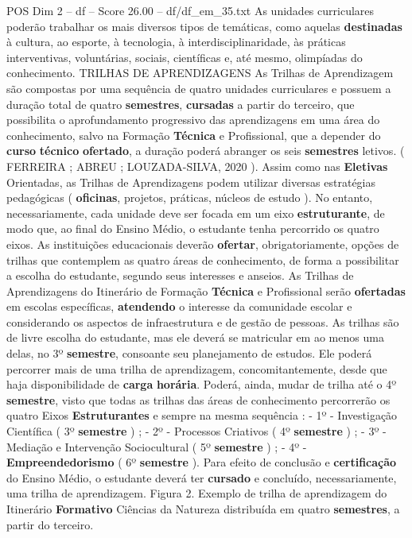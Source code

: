 \begin{textsample}{POS Dim 2 – df – Score 26.00 – df/df\_em\_35.txt}
As unidades curriculares poderão trabalhar os mais diversos tipos de temáticas, como aquelas \textbf{destinadas} à cultura, ao esporte, à tecnologia, à interdisciplinaridade, às práticas interventivas, voluntárias, sociais, científicas e, até mesmo, olimpíadas do conhecimento.
TRILHAS DE APRENDIZAGENS As Trilhas de Aprendizagem são compostas por uma sequência de quatro unidades curriculares e possuem a duração total de quatro \textbf{semestres}, \textbf{cursadas} a partir do terceiro, que possibilita o aprofundamento progressivo das aprendizagens em uma área do conhecimento, salvo na Formação \textbf{Técnica} e Profissional, que a depender do \textbf{curso} \textbf{técnico} \textbf{ofertado}, a duração poderá abranger os seis \textbf{semestres} letivos. ( FERREIRA ; ABREU ; LOUZADA-SILVA, 2020 ).
Assim como nas \textbf{Eletivas} Orientadas, as Trilhas de Aprendizagens podem utilizar diversas estratégias pedagógicas ( \textbf{oficinas}, projetos, práticas, núcleos de estudo ).
No entanto, necessariamente, cada unidade deve ser focada em um eixo \textbf{estruturante}, de modo que, ao final do Ensino Médio, o estudante tenha percorrido os quatro eixos.
As instituições educacionais deverão \textbf{ofertar}, obrigatoriamente, opções de trilhas que contemplem as quatro áreas de conhecimento, de forma a possibilitar a escolha do estudante, segundo seus interesses e anseios.
As Trilhas de Aprendizagens do Itinerário de Formação \textbf{Técnica} e Profissional serão \textbf{ofertadas} em escolas específicas, \textbf{atendendo} o interesse da comunidade escolar e considerando os aspectos de infraestrutura e de gestão de pessoas.
As trilhas são de livre escolha do estudante, mas ele deverá se matricular em ao menos uma delas, no 3º \textbf{semestre}, consoante seu planejamento de estudos.
Ele poderá percorrer mais de uma trilha de aprendizagem, concomitantemente, desde que haja disponibilidade de \textbf{carga} \textbf{horária}.
Poderá, ainda, mudar de trilha até o 4º \textbf{semestre}, visto que todas as trilhas das áreas de conhecimento percorrerão os quatro Eixos \textbf{Estruturantes} e sempre na mesma sequência : - 1º - Investigação Científica ( 3º \textbf{semestre} ) ; - 2º - Processos Criativos ( 4º \textbf{semestre} ) ; - 3º - Mediação e Intervenção Sociocultural ( 5º \textbf{semestre} ) ; - 4º - \textbf{Empreendedorismo} ( 6º \textbf{semestre} ).
Para efeito de conclusão e \textbf{certificação} do Ensino Médio, o estudante deverá ter \textbf{cursado} e concluído, necessariamente, uma trilha de aprendizagem.
Figura 2.
Exemplo de trilha de aprendizagem do Itinerário \textbf{Formativo} Ciências da Natureza distribuída em quatro \textbf{semestres}, a partir do terceiro.

\end{textsample}
